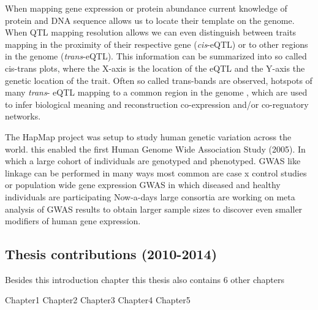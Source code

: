 When mapping gene expression or protein abundance current knowledge of protein and DNA sequence 
allows us to locate their template on the genome. When QTL mapping resolution allows we can even 
distinguish between traits mapping in the proximity of their respective gene (\emph{cis}-eQTL) 
or to other regions in the genome (\emph{trans}-eQTL). This information can be summarized into 
so called cis-trans plots, where the X-axis is the location of the eQTL and the Y-axis the genetic 
location of the trait. Often so called trans-bands are observed, hotspots of many \emph{trans}-
eQTL mapping to a common region in the genome \cite{Breitling:2008a}, which are used to infer 
biological meaning and reconstruction co-expression and/or co-reguatory networks.

The HapMap project was setup to study human genetic variation across the world. this enabled 
the first Human Genome Wide Association Study (2005). In which a large cohort of individuals 
are genotyped and phenotyped. GWAS like linkage can be performed in many ways most common are 
case x control studies or population wide gene expression GWAS in which diseased and healthy 
individuals are participating  Now-a-days large consortia are working on meta analysis of GWAS 
results to obtain larger sample sizes to discover even smaller modifiers of human gene 
expression.

\subsection{Thesis contributions (2010-2014)}
Besides this introduction chapter this thesis also contains 6 other chapters

Chapter1
Chapter2
Chapter3
Chapter4
Chapter5

